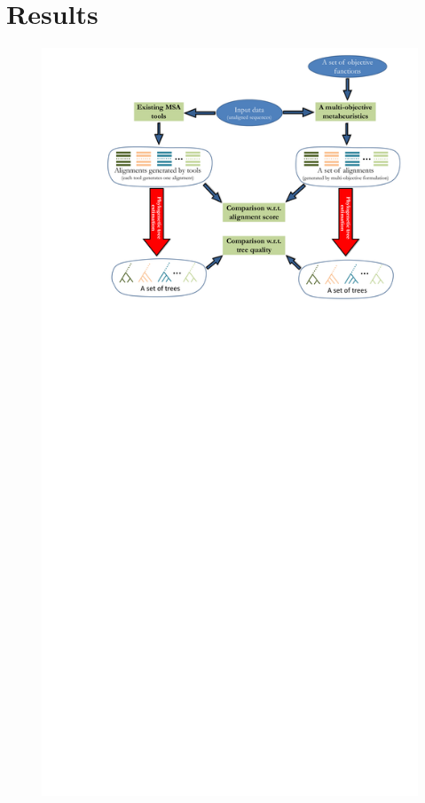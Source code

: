 \section{Results}
\label{sec:results}

\begin{figure}[!htbp]
	\centering
	\includegraphics[width=2\columnwidth]{Figure/pipeline}

\end{figure}
